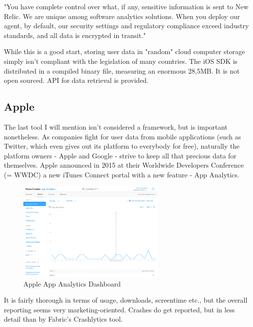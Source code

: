 "You have complete control over what, if any, sensitive information is sent to New Relic. We are unique among software analytics solutions. When you deploy our agent, by default, our security settings and regulatory compliance exceed industry standards, and all data is encrypted in transit." \cite{newrelic}

\bigbreak

While this is a good start, storing user data in "random" cloud computer storage simply isn't compliant with the legislation of many countries. The iOS SDK is distributed in a compiled binary file, measuring an enormous 28,5MB. It is not open sourced. API for data retrieval is provided.

\subsection{Apple}

The last tool I will mention isn't considered a framework, but is important nonetheless. As companies fight for user data from mobile applications (such as Twitter, which even gives out its platform to everybody for free), naturally the platform owners - Apple and Google - strive to keep all that precious data for themselves. Apple announced in 2015 at their Worldwide Developers Conference (= WWDC) a new iTunes Connect portal with a new feature - App Analytics. 

\newpage

\begin{figure}[!ht]
	\centering
	\includegraphics[width=0.65\textwidth]{figures/02_analysis/appleanalytics}
    \caption{Apple App Analytics Dashboard}
\end{figure}

It is fairly thorough in terms of usage, downloads, screentime etc., but the overall reporting seems very marketing-oriented. Crashes do get reported, but in less detail than by Fabric's Crashlytics tool.

